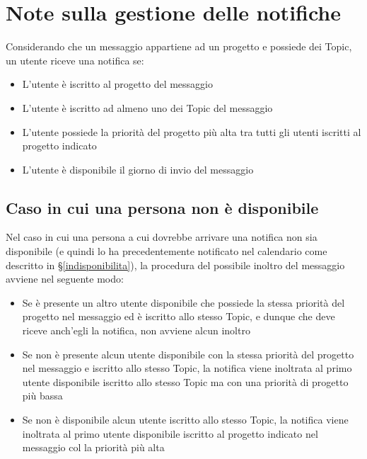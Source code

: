 \section{Note sulla gestione delle notifiche}\label{note}
Considerando che un messaggio appartiene ad un progetto e possiede dei Topic, un utente riceve una notifica se:
\begin{itemize}
    \item L'utente è iscritto al progetto del messaggio
    \item L'utente è iscritto ad almeno uno dei Topic del messaggio
    \item L'utente possiede la priorità del progetto più alta tra tutti gli utenti iscritti al progetto indicato
    \item L'utente è disponibile il giorno di invio del messaggio
\end{itemize}

\subsection{Caso in cui una persona non è disponibile}
Nel caso in cui una persona a cui dovrebbe arrivare una notifica non sia disponibile (e quindi lo ha precedentemente notificato nel calendario come descritto in \S\ref{indisponibilita}), la procedura del possibile inoltro del messaggio avviene nel seguente modo:
\begin{itemize}
    \item Se è presente un altro utente disponibile che possiede la stessa priorità del progetto nel messaggio ed è iscritto allo stesso Topic, e dunque che deve riceve anch'egli la notifica, non avviene alcun inoltro
    \item Se non è presente alcun utente disponibile con la stessa priorità del progetto nel messaggio e iscritto allo stesso Topic, la notifica viene inoltrata al primo utente disponibile iscritto allo stesso Topic ma con una priorità di progetto più bassa
    \item Se non è disponibile alcun utente iscritto allo stesso Topic, la notifica viene inoltrata al primo utente disponibile iscritto al progetto indicato nel messaggio col la priorità più alta
\end{itemize}